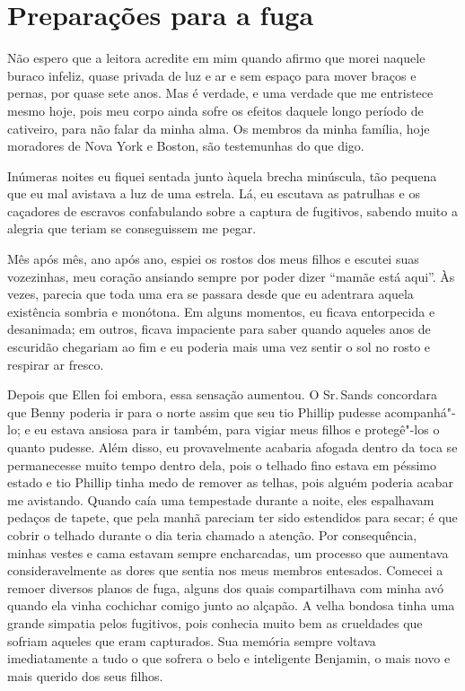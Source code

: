 \chapter*{Preparações para a fuga}

Não espero que a leitora acredite em
mim quando afirmo que morei naquele buraco infeliz, quase privada de luz
e ar e sem espaço para mover braços e pernas, por quase sete anos. Mas é
verdade, e uma verdade que me entristece mesmo hoje, pois meu corpo
ainda sofre os efeitos daquele longo período de cativeiro, para não
falar da minha alma. Os membros da minha família, hoje moradores de Nova
York e Boston, são testemunhas do que digo.

Inúmeras noites eu fiquei sentada junto
àquela brecha minúscula, tão pequena que eu mal avistava a luz de uma
estrela. Lá, eu escutava as patrulhas e os caçadores de escravos
confabulando sobre a captura de fugitivos, sabendo muito a alegria que
teriam se conseguissem me pegar.

Mês após mês, ano após ano, espiei os
rostos dos meus filhos e escutei suas vozezinhas, meu coração ansiando
sempre por poder dizer ``mamãe está aqui''. Às vezes, parecia que toda
uma era se passara desde que eu adentrara aquela existência sombria e
monótona. Em alguns momentos, eu ficava entorpecida e desanimada; em
outros, ficava impaciente para saber quando aqueles anos de escuridão
chegariam ao fim e eu poderia mais uma vez sentir o sol no rosto e
respirar ar fresco.

Depois que Ellen foi embora, essa
sensação aumentou. O Sr.\,Sands concordara que Benny poderia ir para o
norte assim que seu tio Phillip pudesse acompanhá"-lo; e eu estava
ansiosa para ir também, para vigiar meus filhos e protegê"-los o quanto
pudesse. Além disso, eu provavelmente acabaria afogada dentro da toca se
permanecesse muito tempo dentro dela, pois o telhado fino estava em
péssimo estado e tio Phillip tinha medo de remover as telhas, pois
alguém poderia acabar me avistando. Quando caía uma tempestade durante a
noite, eles espalhavam pedaços de tapete, que pela manhã pareciam ter
sido estendidos para secar; é que cobrir o telhado durante o dia teria
chamado a atenção. Por consequência, minhas vestes e cama estavam sempre
encharcadas, um processo que aumentava consideravelmente as dores que
sentia nos meus membros entesados. Comecei a remoer diversos planos de
fuga, alguns dos quais compartilhava com minha avó quando ela vinha
cochichar comigo junto ao alçapão. A velha bondosa tinha uma grande
simpatia pelos fugitivos, pois conhecia muito bem as crueldades que
sofriam aqueles que eram capturados. Sua memória sempre voltava
imediatamente a tudo o que sofrera o belo e inteligente Benjamin, o mais
novo e mais querido dos seus filhos.

